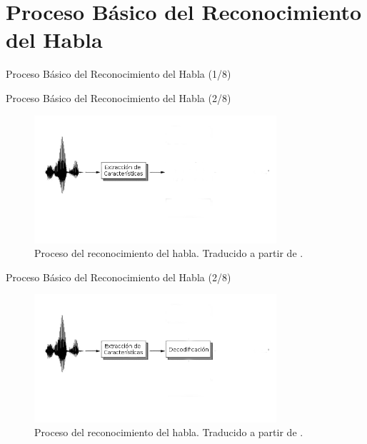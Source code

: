 \section{Proceso B\'asico del Reconocimiento del Habla}

\begin{frame}{Proceso B\'asico del Reconocimiento del Habla (1/8)}

\end{frame}

\begin{frame}{Proceso B\'asico del Reconocimiento del Habla (2/8)}

\begin{figure}[H] 
\centering
\includegraphics[width=0.8\textwidth]{./graphics/proceso_0.png}
\caption{Proceso del reconocimiento del habla. Traducido a partir de \protect\cite{VerenichASR}.}
\label{figure:proceso}
\end{figure}
\end{frame}

\begin{frame}{Proceso B\'asico del Reconocimiento del Habla (2/8)}

\begin{figure}[H]  
\centering
\includegraphics[width=0.8\textwidth]{./graphics/proceso_1.png}
\caption{Proceso del reconocimiento del habla. Traducido a partir de \protect\cite{VerenichASR}.}
\label{figure:proceso}
\end{figure}
\end{frame}

